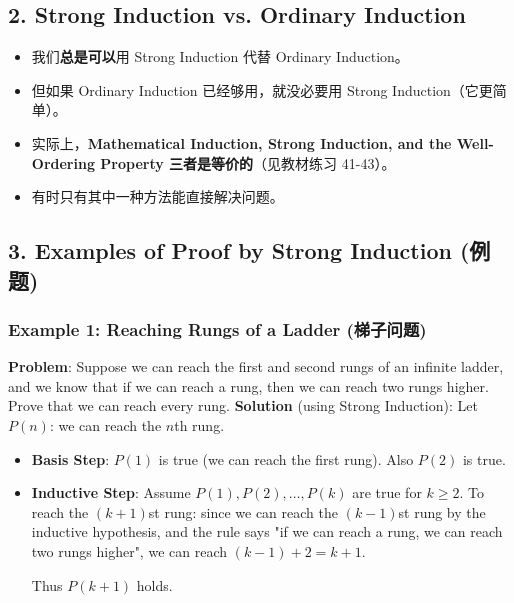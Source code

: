 \documentclass[10pt,a4paper,openany]{ctexbook}
\theoremstyle{definition}
\theoremstyle{remark}
\begin{document}
\vspace{-2pt}

\subsection{2. Strong Induction vs. Ordinary Induction}

\begin{itemize}
\item 我们\textbf{总是可以}用 Strong Induction 代替 Ordinary Induction。
\item 但如果 Ordinary Induction 已经够用，就没必要用 Strong Induction（它更简单）。
\item 实际上，\textbf{Mathematical Induction, Strong Induction, and the Well-Ordering Property 三者是等价的}（见教材练习 41-43）。
\item 有时只有其中一种方法能直接解决问题。

\end{itemize}

\vspace{-2pt}

\subsection{3. Examples of Proof by Strong Induction (例题)}

\subsubsection{Example 1: Reaching Rungs of a Ladder (梯子问题)}

\textbf{Problem}: Suppose we can reach the first and second rungs of an infinite ladder, and we know that if we can reach a rung, then we can reach two rungs higher. Prove that we can reach every rung.
\textbf{Solution} (using Strong Induction):
Let $P(n)$: we can reach the $n$th rung.
\begin{itemize}
\item \textbf{Basis Step}: $P(1)$ is true (we can reach the first rung). Also $P(2)$ is true.
\item \textbf{Inductive Step}: Assume $P(1), P(2), \dots, P(k)$ are true for $k \ge 2$.
To reach the $(k+1)$st rung: since we can reach the $(k-1)$st rung by the inductive hypothesis, and the rule says "if we can reach a rung, we can reach two rungs higher", we can reach $(k-1)+2 = k+1$.

Thus $P(k+1)$ holds.


\end{itemize}
\end{document}
